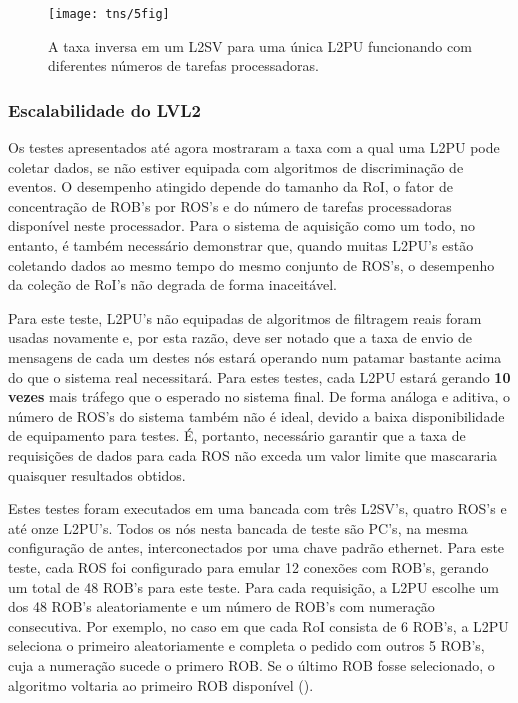 \begin{figure}
\begin{center}
\texttt{[image: tns/5fig]}
\end{center}
\caption{A taxa inversa em um L2SV para uma única L2PU funcionando com
diferentes números de tarefas processadoras.}
\label{fig:tns-5fig}
\end{figure}

\subsubsection{Escalabilidade do LVL2}

Os testes apresentados até agora mostraram a taxa com a qual uma L2PU pode
coletar dados, se não estiver equipada com algoritmos de discriminação de
eventos. O desempenho atingido depende do tamanho da RoI, o fator de
concentração de ROB's por ROS's e do número de tarefas processadoras
disponível neste processador. Para o sistema de aquisição como um todo, no
entanto, é também necessário demonstrar que, quando muitas L2PU's estão
coletando dados ao mesmo tempo do mesmo conjunto de ROS's, o desempenho da
coleção de RoI's não degrada de forma inaceitável.

Para este teste, L2PU's não equipadas de algoritmos de filtragem reais foram
usadas novamente e, por esta razão, deve ser notado que a taxa de envio de
mensagens de cada um destes nós estará operando num patamar bastante acima do
que o sistema real necessitará. Para estes testes, cada L2PU estará gerando
\textbf{10 vezes} mais tráfego que o esperado no sistema final. De forma
análoga e aditiva, o número de ROS's do sistema também não é ideal, devido a
baixa disponibilidade de equipamento para testes. É, portanto, necessário
garantir que a taxa de requisições de dados para cada ROS não exceda um valor
limite que mascararia quaisquer resultados obtidos.

Estes testes foram executados em uma bancada com três L2SV's, quatro ROS's e
até onze L2PU's. Todos os nós nesta bancada de teste são PC's, na mesma
configuração de antes, interconectados por uma chave padrão 
ethernet. Para este teste, cada ROS foi configurado para emular 12 conexões
com ROB's, gerando um total de 48 ROB's para este teste. Para cada requisição,
a L2PU escolhe um dos 48 ROB's aleatoriamente e um número de ROB's com
numeração consecutiva. Por exemplo, no caso em que cada RoI consista de 6
ROB's, a L2PU seleciona o primeiro aleatoriamente e completa o pedido com
outros 5 ROB's, cuja a numeração sucede o primero ROB. Se o último ROB fosse
selecionado, o algoritmo voltaria ao primeiro ROB disponível
().

